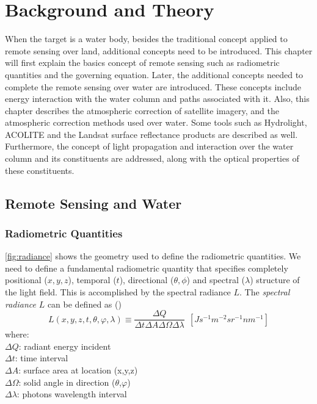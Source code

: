 \chapter{Background and Theory}
\label{ch:background}
When the target is a water body, besides the traditional concept applied to remote sensing over land, additional concepts need to be introduced. This chapter will first explain the basics concept of remote sensing such as radiometric quantities and the governing equation. Later, the additional concepts needed to complete the remote sensing over water are introduced. These concepts include energy interaction with the water column and paths associated with it. Also, this chapter describes the atmospheric correction of satellite imagery, and the atmospheric correction methods used over water. Some tools such as Hydrolight, ACOLITE and the Landsat surface reflectance products are described as well. Furthermore, the concept of light propagation and interaction over the water column and its constituents are addressed, along with the optical properties of these constituents.  
\section{Remote Sensing and Water}
\subsection{Radiometric Quantities}
\autoref{fig:radiance} shows the geometry used to define the radiometric quantities. We need to define a fundamental radiometric quantity that specifies completely positional ($x,y,z$), temporal ($t$), directional ($\theta,\phi$) and spectral ($\lambda$) structure of the light field. This is accomplished by the spectral radiance $L$. The {\it spectral radiance} $L$  can be defined as (\cite{Mobley:2001})
\begin{equation}\label{eq:rad1}
  L(x,y,z,t,\theta,\varphi,\lambda)\equiv\frac{\Delta Q}{\Delta t\Delta A\Delta\Omega\Delta\lambda}~~\left[ Js^{-1}m^{-2}sr^{-1}nm^{-1} \right]
\end{equation}
where:\\
      \noindent $\Delta Q$: radiant energy incident \\
      $\Delta t$: time interval \\
      $\Delta A$: surface area at location (x,y,z)\\
      $\Delta\Omega$: solid angle in direction ($\theta$,$\varphi$) \\
      $\Delta\lambda$: photons wavelength interval

